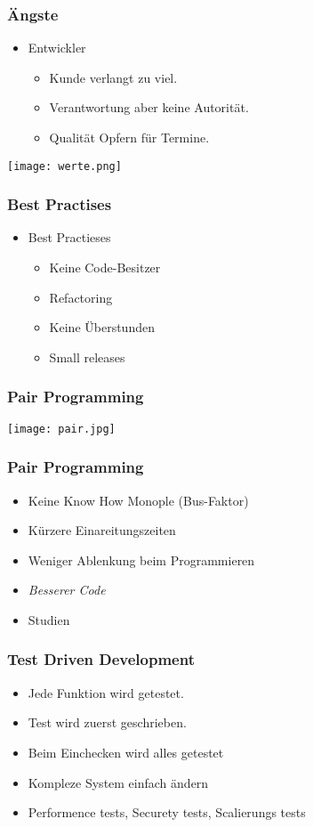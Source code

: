 \documentclass[compress, blue]{beamer}
\begin{document}
\begin{frame}\frametitle{Ängste}
  \begin{itemize}
  \item Entwickler \pause
    \begin{itemize}
    \item Kunde verlangt zu viel. \pause
    \item Verantwortung aber keine Autorität. \pause
    \item Qualität Opfern für Termine. \pause
    \end{itemize}
  \end{itemize}
\end{frame}

\begin{frame}
  \texttt{[image: werte.png]}
\end{frame}

\begin{frame}\frametitle{Best Practises}
  \begin{itemize}
  \item Best Practieses \pause
    \begin{itemize}
    \item Keine Code-Besitzer\pause
    \item Refactoring \pause
    \item Keine Überstunden \pause
    \item Small releases
    \end{itemize}
  \end{itemize}
\end{frame}

\begin{frame}\frametitle{Pair Programming}
    \texttt{[image: pair.jpg]}
\end{frame}

\begin{frame}\frametitle{Pair Programming}
  \begin{itemize}
  \item Keine Know How Monople (Bus-Faktor) \pause
  \item Kürzere Einareitungszeiten \pause
  \item Weniger Ablenkung beim Programmieren \pause
  \item \textit{Besserer Code} \pause
  \item Studien
  \end{itemize}
\end{frame}

\begin{frame}\frametitle{Test Driven Development}
  \begin{itemize}
  \item Jede Funktion wird getestet.  \pause
  \item Test wird zuerst geschrieben. \pause
  \item Beim Einchecken wird alles getestet \pause
  \item Kompleze System einfach ändern\pause
  \item Performence tests, Securety tests, Scalierungs tests
  \end{itemize}
\end{frame}
\end{document}
